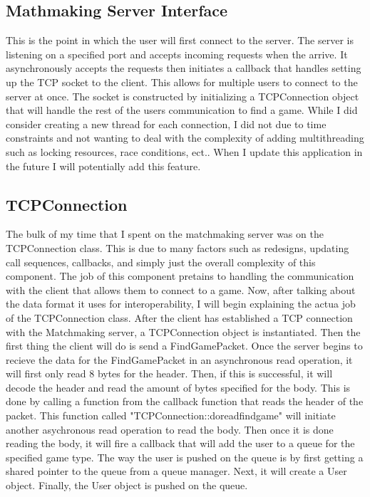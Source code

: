 \documentclass[conference]{IEEEtran}
\begin{document}
\subsection{Mathmaking Server Interface}
This is the point in which the user will first connect to the server.
The server is listening on a specified port and accepts incoming requests when the arrive. 
It asynchronously accepts the requests then initiates a callback that handles setting up the TCP socket to the client.
This allows for multiple users to connect to the server at once. 
The socket is constructed by initializing a TCPConnection object that will handle the rest of the users communication to find a game.
While I did consider creating a new thread for each connection, I did not due to time constraints and not wanting to deal with the complexity of adding multithreading such as locking resources, race conditions, ect..
When I update this application in the future I will potentially add this feature.

\subsection{TCPConnection}
The bulk of my time that I spent on the matchmaking server was on the TCPConnection class.
This is due to many factors such as redesigns, updating call sequences, callbacks, and simply just the overall complexity of this component.
The job of this component pretains to handling the communication with the client that allows them to connect to a game.
Now, after talking about the data format it uses for interoperability, I will begin explaining the actua job of the TCPConnection class.
After the client has established a TCP connection with the Matchmaking server, a TCPConnection object is instantiated.
Then the first thing the client will do is send a FindGamePacket.
Once the server begins to recieve the data for the FindGamePacket in an asynchronous read operation, it will first only read 8 bytes for the header.
Then, if this is successful, it will decode the header and read the amount of bytes specified for the body.
This is done by calling a function from the callback function that reads the header of the packet.
This function called "TCPConnection::do\textunderscore read\textunderscore find\textunderscore game\textunderscorebody" will initiate another asychronous read operation to read the body.
Then once it is done reading the body, it will fire a callback that will add the user to a queue for the specified game type.
The way the user is pushed on the queue is by first getting a shared pointer to the queue from a queue manager.
Next, it will create a User object.
Finally, the User object is pushed on the queue.
\end{document}
